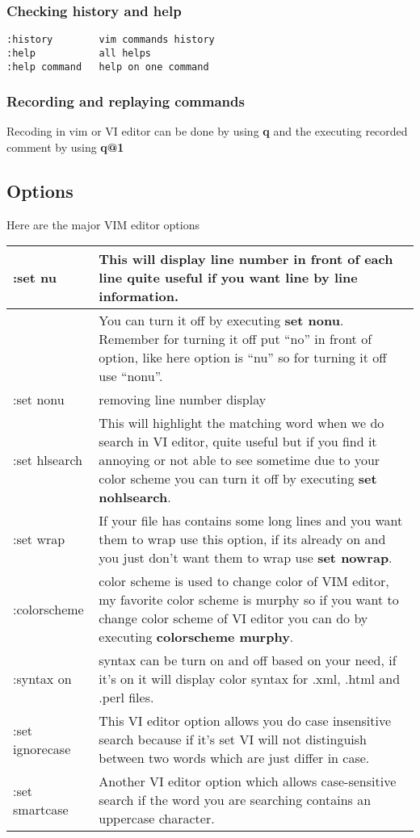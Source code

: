 \documentclass[letterpaper,10pt,english]{sphinxmanual}
\begin{document}
\subsubsection{Checking history and help}
\label{editor/vim:checking-history-and-help}
\begin{Verbatim}[commandchars=\\\{\}]
:history        vim commands history
:help           all helps
:help command   help on one command
\end{Verbatim}


\subsubsection{Recording and replaying commands}
\label{editor/vim:recording-and-replaying-commands}
Recoding in vim or VI editor can be done by using \textbf{q} and the executing recorded comment by using \textbf{q@1}


\subsection{Options}
\label{editor/vim:options}
Here are the major VIM editor options

\begin{tabulary}{\linewidth}{|L|L|}
\hline

:set nu
 & 
This will display line number in front of each line quite useful if you want line by line information.
\\
\hline & 
You can turn it off by executing \textbf{set nonu}. Remember for turning it off put ``no'' in front of option, like here option is ``nu'' so for turning it off use ``nonu''.
\\
\hline
:set nonu
 & 
removing line number display
\\
\hline
:set hlsearch
 & 
This will highlight the matching word when we do search in VI editor, quite useful but if you find it annoying or not able to see sometime due to your color scheme you can turn it off by executing \textbf{set nohlsearch}.
\\
\hline
:set wrap
 & 
If your file has contains some long lines and you want them to wrap use this option, if its already on and you just don't want them to wrap use \textbf{set nowrap}.
\\
\hline
:colorscheme
 & 
color scheme is used to change color of VIM editor, my favorite color scheme is murphy so if you want to change color scheme of VI editor you can do by executing \textbf{colorscheme murphy}.
\\
\hline
:syntax on
 & 
syntax can be turn on and off based on your need, if it's on it will display color syntax for .xml, .html and .perl files.
\\
\hline
:set ignorecase
 & 
This VI editor option allows you do case insensitive search because if it's set VI will not distinguish between two words which are just differ in case.
\\
\hline
:set smartcase
 & 
Another VI editor option which allows case-sensitive search if the word you are searching contains an uppercase character.
\\
\hline\end{tabulary}
\end{document}
